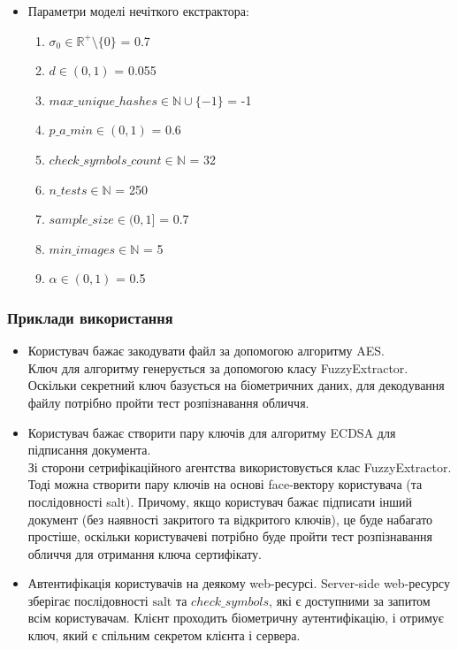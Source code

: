 \documentclass[11pt]{article}
\providecommand{\tightlist}{%
      \setlength{\itemsep}{0pt}\setlength{\parskip}{0pt}}
\begin{document}
    \begin{itemize}
\item
  Параметри моделі нечіткого екстрактора:

  \begin{enumerate}
  \def\labelenumi{\arabic{enumi}.}
  \tightlist
  \item
    \(\sigma_0 \in \mathbb{R}^+\setminus \{0\}\) = 0.7
  \item
    \(d \in (0,1)\) = 0.055
  \item
    \(max\_unique\_hashes \in \mathbb{N}\cup \{-1\}\) = -1
  \item
    \(p\_a\_min \in (0,1)\) = 0.6
  \item
    \(check\_symbols\_count \in \mathbb{N}\) = 32
  \item
    \(n\_tests \in \mathbb{N}\) = 250
  \item
    \(sample\_size \in (0,1]\) = 0.7
  \item
    \(min\_images \in \mathbb{N}\) = 5
  \item
    \(\alpha \in (0,1)\) = 0.5
  \end{enumerate}
\end{itemize}

    \hypertarget{ux43fux440ux438ux43aux43bux430ux434ux438-ux432ux438ux43aux43eux440ux438ux441ux442ux430ux43dux43dux44f}{%
\subsubsection{Приклади
використання}\label{ux43fux440ux438ux43aux43bux430ux434ux438-ux432ux438ux43aux43eux440ux438ux441ux442ux430ux43dux43dux44f}}

\begin{itemize}
\tightlist
\item
  Користувач бажає закодувати файл за допомогою алгоритму AES.\\
  Ключ для алгоритму генерується за допомогою класу FuzzyExtractor.
  Оскільки секретний ключ базується на біометричних даних, для декодування файлу потрібно пройти тест розпізнавання
  обличчя.
\item
  Користувач бажає створити пару ключів для алгоритму ECDSA для
  підписання документа.\\
  Зі сторони сетрифікаційного агентства використовується клас
  FuzzyExtractor.\\
  Тоді можна створити пару ключів на основі face-вектору користувача (та
  послідовності salt). Причому, якщо користувач бажає підписати інший
  документ (без наявності закритого та відкритого ключів), це буде
  набагато простіше, оскільки користувачеві потрібно буде пройти тест
  розпізнавання обличчя для отримання ключа сертифікату.
\item
  Автентифікація користувачів на деякому web-ресурсі. Server-side
  web-ресурсу зберігає послідовності
  \(\text{salt}\) та \(check\_symbols\), які є доступними за
  запитом всім користувачам. Клієнт проходить
  біометричну аутентифікацію, і отримує ключ, який є спільним секретом
  клієнта і сервера.
\end{itemize}
\end{document}
